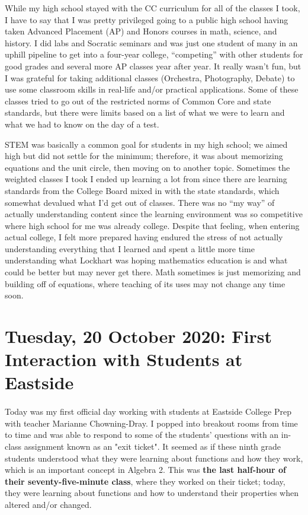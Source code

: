 \documentclass{article}
\begin{document}
While my high school stayed with the CC curriculum for all of the classes I took, I have to say that I was pretty privileged going to a public high school having taken Advanced Placement (AP) and Honors courses in math, science, and history. I did labs and Socratic seminars and was just one student of many in an uphill pipeline to get into a four-year college, “competing” with other students for good grades and several more AP classes year after year. It really wasn’t fun, but I was grateful for taking additional classes (Orchestra, Photography, Debate) to use some classroom skills in real-life and/or practical applications. Some of these classes tried to go out of the restricted norms of Common Core and state standards, but there were limits based on a list of what we were to learn and what we had to know on the day of a test. 

STEM was basically a common goal for students in my high school; we aimed high but did not settle for the minimum; therefore, it was about memorizing equations and the unit circle, then moving on to another topic. Sometimes the weighted classes I took I ended up learning a lot from since there are learning standards from the College Board mixed in with the state standards, which somewhat devalued what I’d get out of classes. There was no “my way” of actually understanding content since the learning environment was so competitive where high school for me was already college. Despite that feeling, when entering actual college, I felt more prepared having endured the stress of not actually understanding everything that I learned and spent a little more time understanding what Lockhart was hoping mathematics education is and what could be better but may never get there. Math sometimes is just memorizing and building off of equations, where teaching of its uses may not change any time soon.  

\section{Tuesday, 20 October 2020: First Interaction with Students at Eastside}

\paragraph{}Today was my first official day working with students at Eastside College Prep with teacher Marianne Chowning-Dray. I popped into breakout rooms from time to time and was able to respond to some of the students' questions with an in-class assignment known as an "exit ticket". It seemed as if these ninth grade students understood what they were learning about functions and how they work, which is an important concept in Algebra 2. This was \textbf{the last half-hour of their seventy-five-minute class}, where they worked on their ticket; today, they were learning about functions and how to understand their properties when altered and/or changed. 
\end{document}
